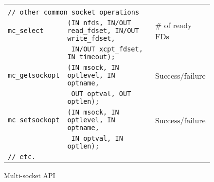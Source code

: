 \documentclass[10pt]{article}
\begin{document}
\begin{figure*}[t]
\begin{small}
\begin{center}
\begin{tabular}{|lll|}
 & & \\
\multicolumn{3}{|l|}{\tt // other common socket operations} \\
{\tt mc\_select} & {\tt (IN nfds, IN/OUT read\_fdset, IN/OUT write\_fdset, } & \# of ready FDs\\
                 & {\tt ~IN/OUT xcpt\_fdset, IN timeout); } & \\
{\tt mc\_getsockopt} & {\tt (IN msock, IN optlevel, IN optname, } & Success/failure\\
                     & {\tt ~OUT optval, OUT optlen); } & \\
{\tt mc\_setsockopt} & {\tt (IN msock, IN optlevel, IN optname, } & Success/failure\\
                     & {\tt ~IN optval, IN optlen); } & \\
{\tt // etc.} & &\\
\hline
\end{tabular}
\end{center}
\end{small}
\caption{Multi-socket API}
\label{fig:api}
\end{figure*}

~
\end{document}
